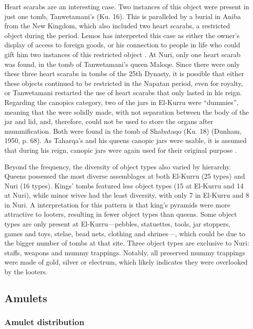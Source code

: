 Heart scarabs are an interesting case. Two instances of this object were present in just one tomb, Tanwetamani's (Ku. 16). This is paralleled by a burial in Aniba from the New Kingdom, which also included two heart scarabs, a restricted object during the period. Lemos has interpreted this case as either the owner's display of access to foreign goods, or his connection to people in life who could gift him two instances of this restricted object \parencites[p.~260]{lemosHeartScarabsOther2021}. At Nuri, only one heart scarab was found, in the tomb of Tanwetamani's queen Maloqe. Since there were only these three heart scarabs in tombs of the 25th Dynasty, it is possible that either these objects continued to be restricted in the Napatan period, even for royalty, or Tanwetamani restarted the use of heart scarabs that only lasted in his reign. Regarding the canopics category, two of the jars in El-Kurru were “dummies”, meaning that the were solidly made, with not separation between the body of the jar and lid, and, therefore, could not be used to store the organs after mummification. Both were found in the tomb of Shabataqo (Ku. 18) (Dunham, 1950, p. 68). As Taharqa's and his queens canopic jars were usable, it is assumed that during his reign, canopic jars were again used for their original purpose \parencites[p.~299]{astonBurialAssemblagesDynasty2009}.
 
 
Beyond the frequency, the diversity of object types also varied by hierarchy. Queens possessed the most diverse assemblages at both El-Kurru (25 types) and Nuri (16 types). Kings' tombs featured less object types (15 at El-Kurru and 14 at Nuri), while minor wives had the least diversity, with only 7 in El-Kurru and 8 in Nuri. A interpretation for this pattern is that king's pyramids were more attractive to looters, resulting in fewer object types than queens. Some object types are only present at El-Kurru---pebbles, statuettes, tools, jar stoppers, games and toys, stelae, bead nets, clothing and shrines---, which could be due to the bigger number of tombs at that site. Three object types are exclusive to Nuri: staffs, weapons and mummy trappings. Notably, all preserved mummy trappings were made of gold, silver or electrum, which likely indicates they were overlooked by the looters.
 
 
 \subsection{Amulets}
 
 
 \subsubsection{Amulet distribution}
 
